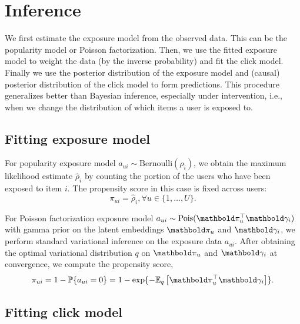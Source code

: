 \section{Inference}  \label{chpt:causal_rec:sec:inference}

We first estimate the exposure model from
the observed data.  This can be the popularity model or Poisson
factorization.  Then, we use the fitted exposure model to weight the
data (by the inverse probability) and fit the click model.  Finally we
use the posterior distribution of the exposure model and (causal)
posterior distribution of the click model to form predictions.  This
procedure generalizes better than Bayesian inference, especially under
intervention, i.e., when we change the distribution of which items a
user is exposed to.

\subsection{Fitting exposure model}

 For popularity exposure model $a_{ui} \sim \mathrm{Bernoulli}(\rho_i)$, we obtain the maximum likelihood estimate $\hat{\rho}_i$ by counting the portion of the users who have been exposed to item $i$. The propensity score in this case is fixed across users: 
\begin{equation}
\pi_{ui} = \hat\rho_i, \forall u \in \{1, \dots, U\}.
\label{chpt:causal_rec:eq:pop_prop}
\end{equation}


 For Poisson factorization exposure model $a_{ui} \sim \pois(\mb\pi_u^\top \mb\gamma_i)$ with gamma prior on the latent embeddings $\mb\pi_u$ and $\mb\gamma_i$, we perform standard variational inference \citep{Gopalan:2015} on the exposure data $a_{ui}$. After obtaining the optimal variational distribution $q$ on $\mb\pi_u$ and $\mb\gamma_i$ at convergence, we compute the propensity score,
\begin{equation}
\pi_{ui} = 1 - \mathbb{P}\{a_{ui} = 0\} = 1 - \exp\{-\EE{q}{\mb\pi_u^\top\mb\gamma_i}\}.
\label{chpt:causal_rec:eq:pf_prop}
\end{equation}

\subsection{Fitting click model}

